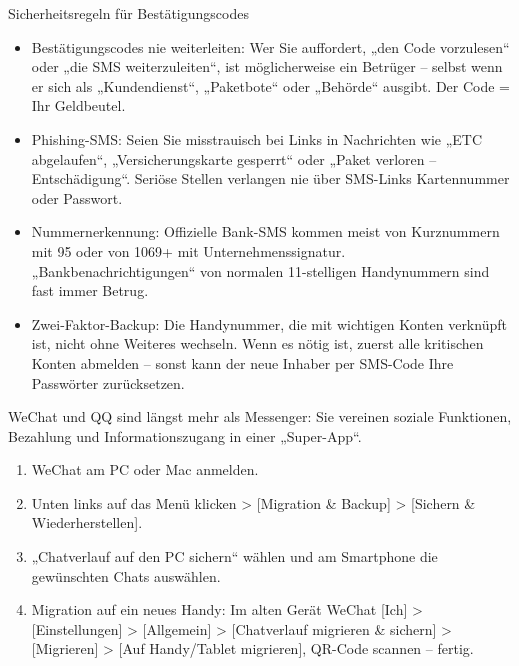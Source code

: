 \begin{tcbwarn}{Sicherheitsregeln für Bestätigungscodes}
\begin{itemize}
  \item Bestätigungscodes nie weiterleiten: Wer Sie auffordert, „den Code vorzulesen“ oder „die SMS weiterzuleiten“, ist möglicherweise ein Betrüger – selbst wenn er sich als „Kundendienst“, „Paketbote“ oder „Behörde“ ausgibt. Der Code = Ihr Geldbeutel.
  \item Phishing-SMS: Seien Sie misstrauisch bei Links in Nachrichten wie „ETC abgelaufen“, „Versicherungskarte gesperrt“ oder „Paket verloren – Entschädigung“. Seriöse Stellen verlangen nie über SMS-Links Kartennummer oder Passwort.
  \item Nummernerkennung: Offizielle Bank-SMS kommen meist von Kurznummern mit 95 oder von 1069+ mit Unternehmenssignatur. „Bankbenachrichtigungen“ von normalen 11-stelligen Handynummern sind fast immer Betrug.
  \item Zwei-Faktor-Backup: Die Handynummer, die mit wichtigen Konten verknüpft ist, nicht ohne Weiteres wechseln. Wenn es nötig ist, zuerst alle kritischen Konten abmelden – sonst kann der neue Inhaber per SMS-Code Ihre Passwörter zurücksetzen.
\end{itemize}

\end{tcbwarn}


WeChat und QQ sind längst mehr als Messenger: Sie vereinen soziale Funktionen, Bezahlung und Informationszugang in einer „Super-App“.


\begin{enumerate}
  \item WeChat am PC oder Mac anmelden.
  \item Unten links auf das Menü klicken > [Migration \& Backup] > [Sichern \& Wiederherstellen].
  \item „Chatverlauf auf den PC sichern“ wählen und am Smartphone die gewünschten Chats auswählen.
  \item Migration auf ein neues Handy: Im alten Gerät WeChat [Ich] > [Einstellungen] > [Allgemein] > [Chatverlauf migrieren \& sichern] > [Migrieren] > [Auf Handy/Tablet migrieren], QR-Code scannen – fertig.
\end{enumerate}


